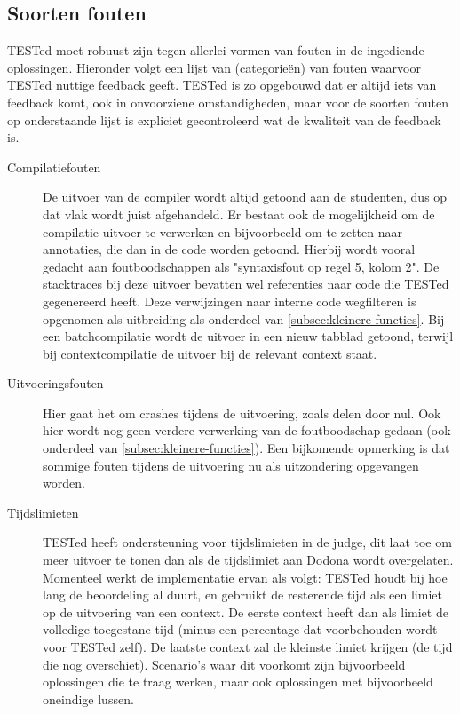 \subsection{Soorten fouten}\label{subsec:soorten-fouten}

TESTed moet robuust zijn tegen allerlei vormen van fouten in de ingediende oplossingen.
Hieronder volgt een lijst van (categorieën) van fouten waarvoor TESTed nuttige feedback geeft.
TESTed is zo opgebouwd dat er altijd iets van feedback komt, ook in onvoorziene omstandigheden, maar voor de soorten fouten op onderstaande lijst is expliciet gecontroleerd wat de kwaliteit van de feedback is.

\begin{description}
    \item[Compilatiefouten] De uitvoer van de compiler wordt altijd getoond aan de studenten, dus op dat vlak wordt juist afgehandeld.
    Er bestaat ook de mogelijkheid om de compilatie-uitvoer te verwerken en bijvoorbeeld om te zetten naar annotaties, die dan in de code worden getoond.
    Hierbij wordt vooral gedacht aan foutboodschappen als "syntaxisfout op regel 5, kolom 2".
    De stacktraces bij deze uitvoer bevatten wel referenties naar code die TESTed gegenereerd heeft.
    Deze verwijzingen naar interne code wegfilteren is opgenomen als uitbreiding als onderdeel van \cref{subsec:kleinere-functies}.
    Bij een batchcompilatie wordt de uitvoer in een nieuw tabblad getoond, terwijl bij contextcompilatie de uitvoer bij de relevant context staat.
    \item[Uitvoeringsfouten] Hier gaat het om crashes tijdens de uitvoering, zoals delen door nul.
    Ook hier wordt nog geen verdere verwerking van de foutboodschap gedaan (ook onderdeel van \cref{subsec:kleinere-functies}).
    Een bijkomende opmerking is dat sommige fouten tijdens de uitvoering nu als uitzondering opgevangen worden.
    \item[Tijdslimieten] TESTed heeft ondersteuning voor tijdslimieten in de judge, dit laat toe om meer uitvoer te tonen dan als de tijdslimiet aan Dodona wordt overgelaten.
    Momenteel werkt de implementatie ervan als volgt: TESTed houdt bij hoe lang de beoordeling al duurt, en gebruikt de resterende tijd als een limiet op de uitvoering van een context.
    De eerste context heeft dan als limiet de volledige toegestane tijd (minus een percentage dat voorbehouden wordt voor TESTed zelf).
    De laatste context zal de kleinste limiet krijgen (de tijd die nog overschiet).
    Scenario's waar dit voorkomt zijn bijvoorbeeld oplossingen die te traag werken, maar ook oplossingen met bijvoorbeeld oneindige lussen.

\end{description}
